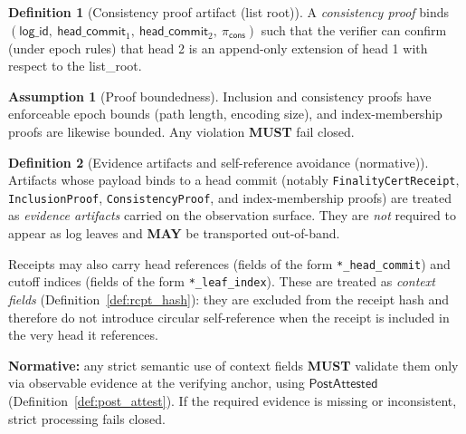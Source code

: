 \documentclass[11pt]{article}
\newcommand{\MUST}{\textbf{MUST}}
\newcommand{\MAY}{\textbf{MAY}}
\newcommand{\code}[1]{\texttt{#1}}
\newcommand{\term}[1]{\emph{#1}}
\newcommand{\1}{\mathbf{1}}
\theoremstyle{definition}
\newtheorem{definition}{Definition}
\newtheorem{assumption}{Assumption}
\theoremstyle{plain}
\begin{document}
\begin{definition}[Consistency proof artifact (list root)]
\label{def:cons}
A \term{consistency proof} binds
$(\textsf{log\_id},\ \textsf{head\_commit}_1,\ \textsf{head\_commit}_2,\ \pi_{\textsf{cons}})$
such that the verifier can confirm (under epoch rules) that head 2 is an append-only extension of head 1 with respect to the \textsf{list\_root}.
\end{definition}

\begin{assumption}[Proof boundedness]
\label{ass:proof_bounded}
Inclusion and consistency proofs have enforceable epoch bounds (path length, encoding size), and index-membership proofs are likewise bounded. Any violation \MUST{} fail closed.
\end{assumption}

\begin{definition}[Evidence artifacts and self-reference avoidance (normative)]
\label{def:offlog_evidence}
Artifacts whose payload binds to a head commit (notably \code{FinalityCertReceipt}, \code{InclusionProof}, \code{ConsistencyProof}, and index-membership proofs) are treated as \term{evidence artifacts} carried on the observation surface. They are \emph{not} required to appear as log leaves and \MAY{} be transported out-of-band.

Receipts may also carry head references (fields of the form \code{*\_head\_commit}) and cutoff indices (fields of the form \code{*\_leaf\_index}). These are treated as \emph{context fields} (Definition~\ref{def:rcpt_hash}): they are excluded from the receipt hash and therefore do not introduce circular self-reference when the receipt is included in the very head it references.

\textbf{Normative:} any strict semantic use of context fields \MUST{} validate them only via observable evidence at the verifying anchor, using $\mathsf{PostAttested}$ (Definition~\ref{def:post_attest}). If the required evidence is missing or inconsistent, strict processing fails closed.
\end{definition}
\end{document}
